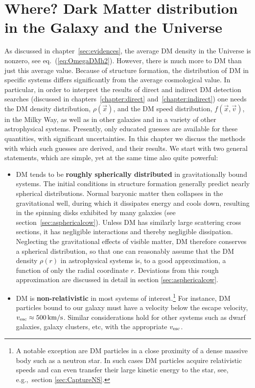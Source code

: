 \chapter{Where? Dark Matter distribution in the Galaxy and the Universe}\label{chapter:distribution}


As discussed in chapter~\ref{sec:evidences}, the average DM density in the Universe is nonzero, see eq.~(\ref{eq:OmegaDMh2}). 
However, there is much more to DM than just this average value. 
Because of structure formation, the distribution of DM in specific systems differs significantly from the average cosmological value.
In particular, in order to interpret the results of direct and indirect DM detection searches (discussed in chapters~\ref{chapter:direct} and~\ref{chapter:indirect}) one needs the DM density distribution, $\rho(\vec x)$, and the DM speed distribution, $f(\vec{x},\vec{v})$, in the Milky Way, as well as in other galaxies and in a variety of other astrophysical systems.
Presently, only educated guesses are available for these quantities, with significant uncertainties. 
In this chapter we discuss the methods with which such guesses are derived, and their results.
We start with two general statements, which are simple, yet at the same time also quite powerful:
 \begin{itemize}
\item[$\circ$] DM tends to be  {\bf roughly spherically distributed} in gravitationally bound systems. 
The initial conditions in structure formation generally predict nearly spherical distributions. 
Normal baryonic matter then collapses in the gravitational well, during which it dissipates energy and cools down, 
resulting in the spinning disks exhibited by many galaxies (see section~\ref{sec:asphericalcow}). 
Unless DM has similarly large scattering cross sections, it has
negligible interactions and thereby negligible dissipation. 
Neglecting the gravitational effects of visible matter, DM therefore conserves a spherical distribution,
so that one can reasonably assume that the DM density  $\rho(r)$ in  astrophysical systems is, to a good approximation, a function of only the radial coordinate $r$. Deviations from this rough approximation are discussed in detail in section \ref{sec:asphericalcow}.

\item[$\circ$] DM is {\bf non-relativistic} in most systems of interest.\footnote{A notable exception are DM particles in a close proximity of a  dense massive body such as a neutron star. In such cases DM particles acquire relativistic speeds and can even transfer their large kinetic energy to the star, see, e.g.,~section \ref{sec:CaptureNS}.} For instance, DM particles bound to our galaxy must have a velocity below the escape velocity, $v_{\rm esc} \approx 500\,{\rm km/s}$. 
Similar considerations hold for other systems such as dwarf galaxies, galaxy clusters, etc, with the appropriate $v_{\rm esc}$.
\end{itemize}
